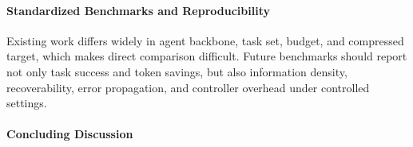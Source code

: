 \paragraph{Standardized Benchmarks and Reproducibility}
Existing work differs widely in agent backbone, task set, budget, and compressed target, which makes direct comparison difficult. Future benchmarks should report not only task success and token savings, but also information density, recoverability, error propagation, and controller overhead under controlled settings.

\paragraph{Concluding Discussion}









